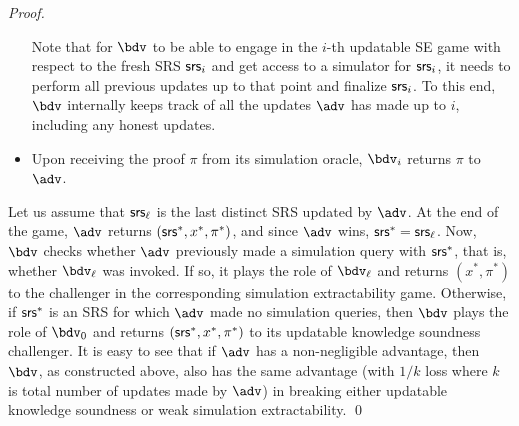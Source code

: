 \begin{proof}
\begin{itemize}
		Note that for $\bdv$ to be able to engage in the $i$-th updatable SE game with respect to the fresh SRS $\mathsf{srs}_{i}$ and get access to a simulator for $\mathsf{srs}_{i}$, it needs to perform all previous updates up to that point and finalize $\mathsf{srs}_{i}$. To this end, $\bdv$  internally keeps track of all the updates $\adv$ has made up to $i$, including any honest updates.
		
		\item
		Upon receiving the proof $\pi$ from its simulation oracle, $\bdv_i$ returns $\pi$ to $\adv$.
		
	\end{itemize}
	
	
	Let us assume that $\mathsf{srs}_\ell$ is the last distinct SRS updated by $\adv$. 
	At the end of the game, $\adv$ returns $(\mathsf{srs}^*, x^*, \pi^*)$, and since $\adv$ wins, $\mathsf{srs}^* = \mathsf{srs}_\ell$. Now, $\bdv$ checks whether 
	$\adv$ previously made a simulation query with
	$\mathsf{srs}^*$, that is, whether $\bdv_\ell$ was invoked. 
	If so, it plays the role of $\bdv_\ell$ and returns $(x^*, \pi^*)$ to the challenger in the corresponding simulation extractability game. 
	Otherwise, if $\mathsf{srs}^*$ is an SRS for which $\adv$ made no simulation queries, then $\bdv$ plays the role of $\bdv_0$ and returns $(\mathsf{srs}^*, x^*, \pi^*)$ to its updatable knowledge soundness challenger. It is easy to see that if $\adv$ has a non-negligible advantage, then $\bdv$, as constructed above, also has the same advantage (with $1/k$ loss where $k$ is total number of updates made by $\adv$) in breaking either updatable knowledge soundness or weak simulation extractability.
\qed
\end{proof}
